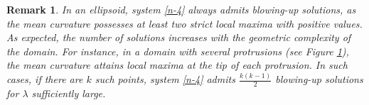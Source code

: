 \documentclass[a4paper,reqno,11pt,oneside]{amsart}
\numberwithin{equation}{section}
\newtheorem{Rem}[Thm]{Remark}
\begin{document}
\begin{Rem}\rm 
In an ellipsoid, system \eqref{n-4} always admits blowing-up solutions, as the mean curvature possesses at least two strict local maxima with positive values. As expected, the number of solutions increases with the geometric complexity of the domain. For instance, in a domain with several protrusions (see Figure \ref{figura1}), the mean curvature attains local maxima at the tip of each protrusion. In such cases, if there are $k$ such points, system \eqref{n-4} admits $\frac{k(k-1)}{2}$ blowing-up solutions for $\lambda$ sufficiently large.

\begin{figure}[h]
\centering
{}
\label{figura1}

\end{figure}
\end{Rem}
\end{document}
